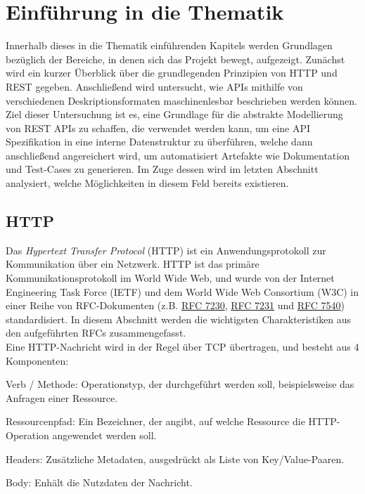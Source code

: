 
\section{Einführung in die Thematik}

Innerhalb dieses in die Thematik einführenden Kapitels werden Grundlagen bezüglich der Bereiche, in denen sich das Projekt bewegt, aufgezeigt. Zunächst wird ein kurzer Überblick über die grundlegenden Prinzipien von HTTP und REST gegeben. Anschließend wird untersucht, wie APIs mithilfe von verschiedenen Deskriptionsformaten maschinenlesbar beschrieben werden können. Ziel dieser Untersuchung ist es, eine Grundlage für die abstrakte Modellierung von REST APIs zu schaffen, die verwendet werden kann, um eine API Spezifikation in eine interne Datenstruktur zu überführen, welche dann anschließend angereichert wird, um automatisiert Artefakte wie Dokumentation und Test-Cases zu generieren. Im Zuge dessen wird im letzten Abschnitt analysiert, welche Möglichkeiten in diesem Feld bereits existieren.

\subsection{HTTP}

Das \emph{Hypertext Transfer Protocol} (HTTP) ist ein Anwendungsprotokoll zur Kommunikation über ein Netzwerk. HTTP ist das primäre Kommunikationsprotokoll im World Wide Web, und wurde von der Internet Engineering Task Force (IETF) und dem World Wide Web Consortium (W3C) in einer Reihe von RFC-Dokumenten (z.B. \href{https://tools.ietf.org/html/rfc7230}{RFC 7230}, \href{https://tools.ietf.org/html/rfc7231}{RFC 7231} und \href{https://tools.ietf.org/html/rfc7540}{RFC 7540}) standardisiert. In diesem Abschnitt werden die wichtigsten Charakteristiken aus den aufgeführten RFCs zusammengefasst. \\

Eine HTTP-Nachricht wird in der Regel über TCP übertragen, und besteht aus 4 Komponenten:

\begin{description}
	\item Verb / Methode: Operationstyp, der durchgeführt werden soll, beispielsweise das Anfragen einer Ressource.
    \item Ressourcenpfad: Ein Bezeichner, der angibt, auf welche Ressource die HTTP-Operation angewendet werden soll.
    \item Headers: Zusätzliche Metadaten, ausgedrückt als Liste von Key/Value-Paaren.
    \item Body: Enhält die Nutzdaten der Nachricht.
\end{description}

